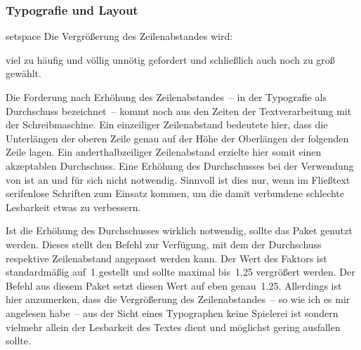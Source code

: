 \subsubsection{Typografie und Layout}
%
\begin{packages}
\item[setspace]
  Die Vergrößerung des Zeilenabstandes wird:
  \begin{enumerate}[itemindent=0pt,labelwidth=*,labelsep=1em,label=\Roman*.]
  \itempackages viel zu häufig und völlig unnötig gefordert und
  \itempackages schließlich auch noch zu groß gewählt.
  \end{enumerate}
  Die Forderung nach Erhöhung des Zeilenabstandes~-- in der Typografie als 
  Durchschuss bezeichnet~-- kommt noch aus den Zeiten der Textverarbeitung mit 
  der Schreibmaschine. Ein einzeiliger Zeilenabstand bedeutete hier, dass die 
  Unterlängen der oberen Zeile genau auf der Höhe der Oberlängen der folgenden 
  Zeile lagen. Ein anderthalbzeiliger Zeilenabstand erzielte hier somit einen 
  akzeptablen Durchschuss. Eine Erhöhung des Durchschusses bei der Verwendung 
  von  ist an und für sich nicht notwendig. Sinnvoll ist dies 
  nur, wenn im Fließtext serifenlose Schriften zum Einsatz kommen, um die damit 
  verbundene schlechte Lesbarkeit etwas zu verbessern.
  
  Ist die Erhöhung des Durchschusses wirklich notwendig, sollte das Paket 
   genutzt werden. Dieses stellt den Befehl 
   zur Verfügung, mit dem der Durchschuss 
  respektive Zeilenabstand angepasst werden kann. Der Wert des Faktors ist 
  standardmäßig auf~1 gestellt und sollte maximal bis~1.25 vergrößert werden. 
  Der Befehl  aus diesem Paket setzt diesen Wert auf 
  eben genau~1.25. Allerdings ist hier anzumerken, dass die Vergrößerung des 
  Zeilenabstandes~-- so wie ich es mir angelesen habe~-- aus der Sicht eines 
  Typographen keine Spielerei ist sondern vielmehr allein der Lesbarkeit des 
  Textes dient und möglichst gering ausfallen sollte.
  

\end{packages}
